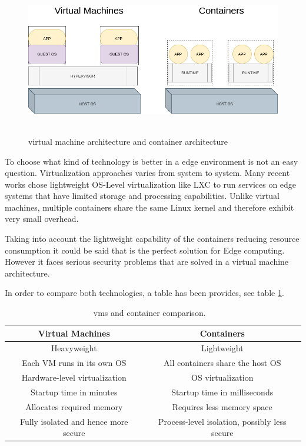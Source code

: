 \begin{figure}[h]%
    \includegraphics[width=6.5in]{figures/virt_container.png}
~\caption{virtual machine architecture and container architecture}
\label{figure2.2}
\end{figure}

To choose what kind of technology is better in a edge environment is not an easy question. Virtualization approaches varies from system to system. Many recent works chose lightweight OS-Level virtualization like LXC to run services on edge systems that have limited storage and processing capabilities. Unlike virtual machines, multiple containers share the same Linux kernel and therefore exhibit very small overhead.~\cite{ACM:clixue:2018}



Taking into account the lightweight capability of the containers reducing resource consumption it could be said that is the perfect solution for Edge computing. However it faces serious security problems that are solved in a virtual machine architecture. 

\newpage

In order to compare both technologies, a table has been provides, see table \ref{table1}.

\begin{table}
    \begin{center}
    \begin{tabular}[h]{|c|c|}
        \hline
        \textbf{Virtual Machines} & \textbf{Containers}\\
        \hline
        Heavyweight & Lightweight\\
        Each VM runs in its own OS	 & All containers share the host OS\\
        Hardware-level virtualization & OS virtualization \\
        Startup time in minutes	 & Startup time in milliseconds \\
        Allocates required memory & Requires less memory space \\
        Fully isolated and hence more secure & Process-level isolation, possibly less secure\\
        \hline
    \end{tabular}
    \caption{vms and container comparison. ~\cite{virt_comparison}}
    \label{table1}
   \end{center}
\end{table}


